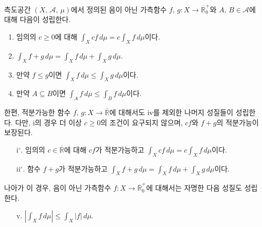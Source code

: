 \begin{theorem}\label{thm:integralProperty}
    측도공간 $(X,\,\mathcal{A},\,\mu)$에서 정의된 음이 아닌 가측함수 $f,\,g:X\to\overline{\mathbb{R}}^+_0$와 $A,\,B\in\mathcal{A}$에 대해 다음이 성립한다.
    \begin{enumerate}
        \item 임의의 $c\geq0$에 대해 $\int_Xcf\,d\mu=c\int_Xf\,d\mu$이다.
        \item $\int_Xf+g\,d\mu=\int_Xf\,d\mu+\int_Xg\,d\mu$.
        \item 만약 $f\leq g$이면 $\int_Xf\,d\mu\leq\int_Xg\,d\mu$이다.
        \item 만약 $A\subseteq B$이면 $\int_Af\,d\mu\leq\int_Bf\,d\mu$이다.
    \end{enumerate}
    한편, 적분가능한 함수 $f,\,g:X\to\overline{\mathbb{R}}$에 대해서도 iv를 제외한 나머지 성질들이 성립한다. 다만, i의 경우 더 이상 $c\geq0$의 조건이 요구되지 않으며, $cf$와 $f+g$의 적분가능이 보장된다.
    \begin{enumerate}
        \item[i$^\circ$.] 임의의 $c\in\overline{\mathbb{R}}$에 대해 $cf$가 적분가능하고 $\int_Xcf\,d\mu=c\int_Xf\,d\mu$이다.
        \item[ii$^\circ$.] 함수 $f+g$가 적분가능하고 $\int_Xf+g\,d\mu=\int_Xf\,d\mu+\int_Xg\,d\mu$이다.\footnotemark
    \end{enumerate}
    나아가 이 경우, 음이 아닌 가측함수 $f:X\to\overline{\mathbb{R}}^+_0$에 대해서는 자명한 다음 성질도 성립한다.
    \begin{enumerate}
        \item[v.] $|\int_Xf\,d\mu|\leq\int_X|f|\,d\mu$.
    \end{enumerate}
\end{theorem}

